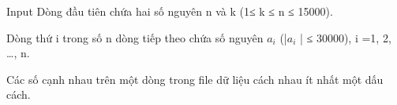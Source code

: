 Input
Dòng đầu tiên chứa hai số nguyên n và k (1≤ k ≤ n ≤ 15000).

Dòng thứ i trong số n dòng tiếp theo chứa số nguyên $a_{i}$ (|$a_{i}$ | ≤ 30000), i =1, 2, …, n.

Các số cạnh nhau trên một dòng trong file dữ liệu cách nhau ít nhất một dấu cách.